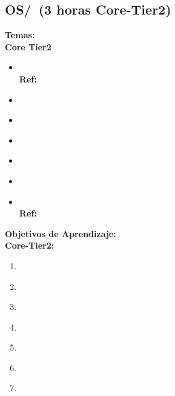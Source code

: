 \subsection{OS/\OSConcurrency~(3 horas Core-Tier2)}\label{sec:BOK:OSConcurrency}
\noindent \textbf{Temas:}\\
\noindent \textbf{Core Tier2}
\begin{itemize}
	\item \OSConcurrencyTopicStates\xspace \\ \textbf{Ref:} \label{sec:BOK:OSConcurrencyTopicStates}
	\item \OSConcurrencyTopicStructures\label{sec:BOK:OSConcurrencyTopicStructures}
	\item \OSConcurrencyTopicDispatching\label{sec:BOK:OSConcurrencyTopicDispatching}
	\item \OSConcurrencyTopicTheRole\label{sec:BOK:OSConcurrencyTopicTheRole}
	\item \OSConcurrencyTopicManaging\label{sec:BOK:OSConcurrencyTopicManaging}
	\item \OSConcurrencyTopicImplementing\label{sec:BOK:OSConcurrencyTopicImplementing}
	\item \OSConcurrencyTopicMultiprocessor\xspace \\ \textbf{Ref:} \label{sec:BOK:OSConcurrencyTopicMultiprocessor}
\end{itemize}


\noindent \textbf{Objetivos de Aprendizaje:}\\
\noindent \textbf{Core-Tier2:}
\begin{enumerate}
	\setcounter{enumi}{0}
	\item \OSConcurrencyLODescribeTheConcurrency\xspace[\OSConcurrencyLODescribeTheConcurrencyLevel]\label{sec:BOK:OSConcurrencyLODescribeTheConcurrency}
	\item \OSConcurrencyLODemonstrateTheTime\xspace[\OSConcurrencyLODemonstrateTheTimeLevel]\label{sec:BOK:OSConcurrencyLODemonstrateTheTime}
	\item \OSConcurrencyLOSummarizeTheMechanisms\xspace[\OSConcurrencyLOSummarizeTheMechanismsLevel]\label{sec:BOK:OSConcurrencyLOSummarizeTheMechanisms}
	\item \OSConcurrencyLOExplainTheThat\xspace[\OSConcurrencyLOExplainTheThatLevel]\label{sec:BOK:OSConcurrencyLOExplainTheThat}
	\item \OSConcurrencyLOSummarizeTechniques\xspace[\OSConcurrencyLOSummarizeTechniquesLevel]\label{sec:BOK:OSConcurrencyLOSummarizeTechniques}
	\item \OSConcurrencyLODescribeReasons\xspace[\OSConcurrencyLODescribeReasonsLevel]\label{sec:BOK:OSConcurrencyLODescribeReasons}
	\item \OSConcurrencyLOCreateState\xspace[\OSConcurrencyLOCreateStateLevel]\label{sec:BOK:OSConcurrencyLOCreateState}
\end{enumerate}


